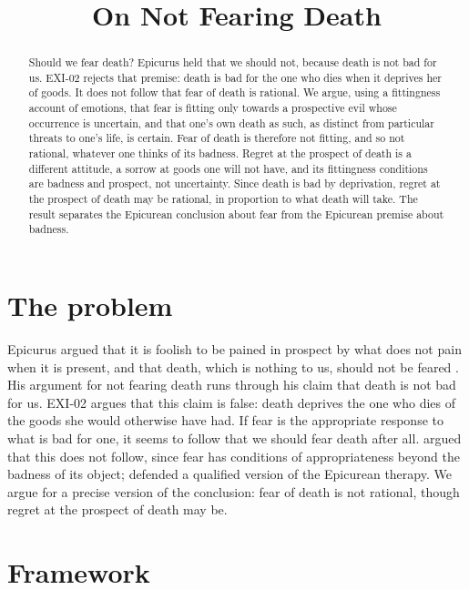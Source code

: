 \documentclass{situationist-preprint}
\title{On Not Fearing Death}
\begin{document}
\maketitle

\begin{abstract}
Should we fear death? Epicurus held that we should not, because death is not bad for us. EXI-02 rejects that premise: death is bad for the one who dies when it deprives her of goods. It does not follow that fear of death is rational. We argue, using a fittingness account of emotions, that fear is fitting only towards a prospective evil whose occurrence is uncertain, and that one's own death as such, as distinct from particular threats to one's life, is certain. Fear of death is therefore not fitting, and so not rational, whatever one thinks of its badness. Regret at the prospect of death is a different attitude, a sorrow at goods one will not have, and its fittingness conditions are badness and prospect, not uncertainty. Since death is bad by deprivation, regret at the prospect of death may be rational, in proportion to what death will take. The result separates the Epicurean conclusion about fear from the Epicurean premise about badness.
\end{abstract}

\section{The problem}

Epicurus argued that it is foolish to be pained in prospect by what does not pain when it is present, and that death, which is nothing to us, should not be feared \citep[125]{EpicurusMen}. His argument for not fearing death runs through his claim that death is not bad for us. EXI-02 argues that this claim is false: death deprives the one who dies of the goods she would otherwise have had. If fear is the appropriate response to what is bad for one, it seems to follow that we should fear death after all. \citet{Kagan2012} argued that this does not follow, since fear has conditions of appropriateness beyond the badness of its object; \citet{Nussbaum1989} defended a qualified version of the Epicurean therapy. We argue for a precise version of the conclusion: fear of death is not rational, though regret at the prospect of death may be.

\section{Framework}
\end{document}
